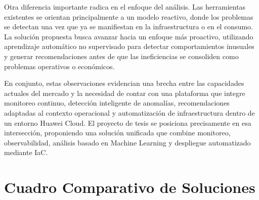 Otra diferencia importante radica en el enfoque del análisis. Las herramientas existentes se orientan principalmente a un modelo reactivo, donde los problemas se detectan una vez que ya se manifiestan en la infraestructura o en el consumo. La solución propuesta busca avanzar hacia un enfoque más proactivo, utilizando aprendizaje automático no supervisado para detectar comportamientos inusuales y generar recomendaciones antes de que las ineficiencias se consoliden como problemas operativos o económicos.

En conjunto, estas observaciones evidencian una brecha entre las capacidades actuales del mercado y la necesidad de contar con una plataforma que integre monitoreo continuo, detección inteligente de anomalías, recomendaciones adaptadas al contexto operacional y automatización de infraestructura dentro de un entorno Huawei Cloud. El proyecto de tesis se posiciona precisamente en esa intersección, proponiendo una solución unificada que combine monitoreo, observabilidad, análisis basado en Machine Learning y despliegue automatizado mediante IaC.

\section{Cuadro Comparativo de Soluciones}


